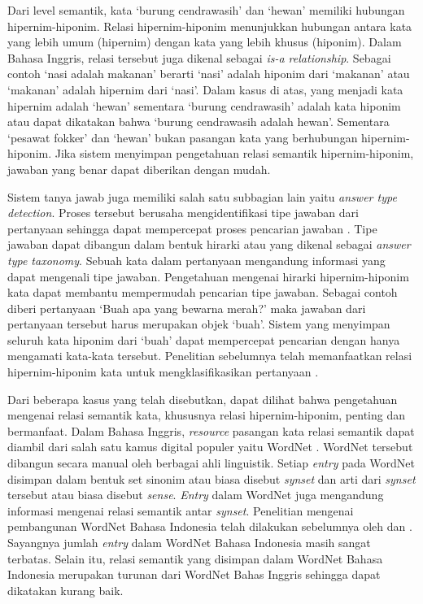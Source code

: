 Dari level semantik, kata `burung cendrawasih' dan `hewan' memiliki hubungan hipernim-hiponim. Relasi hipernim-hiponim menunjukkan hubungan antara kata yang lebih umum (hipernim) dengan kata yang lebih khusus (hiponim). Dalam Bahasa Inggris, relasi tersebut juga dikenal sebagai \textit{is-a relationship}. Sebagai contoh `nasi adalah makanan' berarti `nasi' adalah hiponim dari `makanan' atau `makanan' adalah hipernim dari `nasi'. Dalam kasus di atas, yang menjadi kata hipernim adalah `hewan' sementara `burung cendrawasih' adalah kata hiponim atau dapat dikatakan bahwa `burung cendrawasih adalah hewan'. Sementara `pesawat fokker' dan `hewan' bukan pasangan kata yang berhubungan hipernim-hiponim. Jika sistem menyimpan pengetahuan relasi semantik hipernim-hiponim, jawaban yang benar dapat diberikan dengan mudah.

Sistem tanya jawab juga memiliki salah satu subbagian lain yaitu \textit{answer type detection}. Proses tersebut berusaha mengidentifikasi tipe jawaban dari pertanyaan sehingga dapat mempercepat proses pencarian jawaban \citep{jurafsky2000speech}. Tipe jawaban dapat dibangun dalam bentuk hirarki atau yang dikenal sebagai \textit{answer type taxonomy}. Sebuah kata dalam pertanyaan mengandung informasi yang dapat mengenali tipe jawaban. Pengetahuan mengenai hirarki hipernim-hiponim kata dapat membantu mempermudah pencarian tipe jawaban. Sebagai contoh diberi pertanyaan `Buah apa yang bewarna merah?' maka jawaban dari pertanyaan tersebut harus merupakan objek `buah'. Sistem yang menyimpan seluruh kata hiponim dari `buah' dapat mempercepat pencarian dengan hanya mengamati kata-kata tersebut. Penelitian sebelumnya telah memanfaatkan relasi hipernim-hiponim kata untuk mengklasifikasikan pertanyaan \citep{huang2008question}.

Dari beberapa kasus yang telah disebutkan, dapat dilihat bahwa pengetahuan mengenai relasi semantik kata, khususnya relasi hipernim-hiponim, penting dan bermanfaat. Dalam Bahasa Inggris, \textit{resource} pasangan kata relasi semantik dapat diambil dari salah satu kamus digital populer yaitu WordNet \citep{fellbaum1998wordnet}. WordNet tersebut dibangun secara manual oleh berbagai ahli linguistik. Setiap \textit{entry} pada WordNet disimpan dalam bentuk set sinonim atau biasa disebut \textit{synset} dan arti dari \textit{synset} tersebut atau biasa disebut \textit{sense}. \textit{Entry} dalam WordNet juga mengandung informasi mengenai relasi semantik antar \textit{synset}. Penelitian mengenai pembangunan WordNet Bahasa Indonesia telah dilakukan sebelumnya oleh  \cite{putra2008building} dan \citep{noor2011creating}. Sayangnya jumlah \textit{entry} dalam WordNet Bahasa Indonesia masih sangat terbatas. Selain itu, relasi semantik yang disimpan dalam WordNet Bahasa Indonesia merupakan turunan dari WordNet Bahas Inggris sehingga dapat dikatakan kurang baik.


